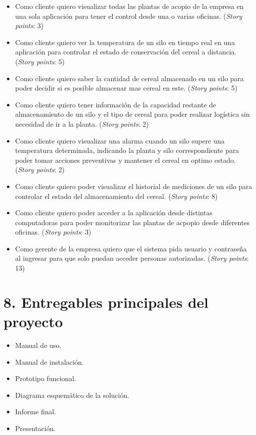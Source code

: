 \documentclass[
11pt, %
]{charter}
\begin{document}
\begin{itemize}
\item Como cliente quiero visualizar todas las plantas de acopio de la empresa en una sola aplicación para tener el control desde una o varias oficinas. (\textit{Story points}: 3)

\item Como cliente quiero ver la temperatura de un silo en tiempo real en una aplicación para controlar el estado de conservación del cereal a distancia. (\textit{Story points}: 5)

\item Como cliente quiero saber la cantidad de cereal almacenado en un silo para poder decidir si es posible almacenar mas cereal en este.  (\textit{Story points}: 5)

\item Como cliente quiero tener información de la capacidad restante de almacenamiento de un silo y el tipo de cereal para poder realizar logística sin necesidad de ir a la planta. (\textit{Story points}: 2)

\item Como cliente quiero visualizar una alarma cuando un silo supere una temperatura determinada, indicando la planta y silo correspondiente para poder tomar acciones preventivas y mantener el cereal en optimo estado. (\textit{Story points}: 2)

\item Como cliente quiero poder visualizar el historial de mediciones de un silo para controlar el estado del almacenamiento del cereal. (\textit{Story points}: 8)

\item Como cliente quiero poder acceder a la aplicación desde distintas computadoras para poder monitorizar las plantas de acpopio desde diferentes oficinas. (\textit{Story points}: 3)

\item Como gerente de la empresa quiero que el sistema pida usuario y contraseña al ingresar para que solo puedan acceder personas autorizadas. (\textit{Story points}: 13)
\end{itemize}

\section{8. Entregables principales del proyecto}
\label{sec:entregables}

\begin{itemize}
	\item Manual de uso.
	\item Manual de instalación.
	\item Prototipo funcional.
	\item Diagrama esquemático de la solución.
	\item Informe final.
	\item Presentación.
\end{itemize}
\end{document}
